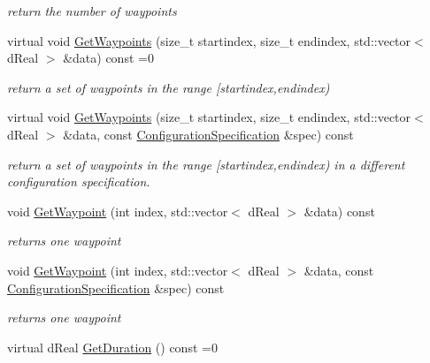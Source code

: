 \begin{DoxyCompactItemize}
\begin{DoxyCompactList}\small\item\em return the number of waypoints \item\end{DoxyCompactList}\item 
virtual void \hyperlink{classOpenRAVE_1_1TrajectoryBase_a27ce506aadd014e6c7e960daf5840e92}{GetWaypoints} (size\_\-t startindex, size\_\-t endindex, std::vector$<$ dReal $>$ \&data) const =0
\begin{DoxyCompactList}\small\item\em return a set of waypoints in the range \mbox{[}startindex,endindex) \item\end{DoxyCompactList}\item 
virtual void \hyperlink{classOpenRAVE_1_1TrajectoryBase_a6a20ad14d835b86e00ecfb25fd1b2b3b}{GetWaypoints} (size\_\-t startindex, size\_\-t endindex, std::vector$<$ dReal $>$ \&data, const \hyperlink{classOpenRAVE_1_1ConfigurationSpecification}{ConfigurationSpecification} \&spec) const 
\begin{DoxyCompactList}\small\item\em return a set of waypoints in the range \mbox{[}startindex,endindex) in a different configuration specification. \item\end{DoxyCompactList}\item 
void \hyperlink{classOpenRAVE_1_1TrajectoryBase_aaf8eb26adc6ee1d49723d97bc5b06fc6}{GetWaypoint} (int index, std::vector$<$ dReal $>$ \&data) const 
\begin{DoxyCompactList}\small\item\em returns one waypoint \item\end{DoxyCompactList}\item 
void \hyperlink{classOpenRAVE_1_1TrajectoryBase_accf42064cea2190dc8756f945d40b59b}{GetWaypoint} (int index, std::vector$<$ dReal $>$ \&data, const \hyperlink{classOpenRAVE_1_1ConfigurationSpecification}{ConfigurationSpecification} \&spec) const 
\begin{DoxyCompactList}\small\item\em returns one waypoint \item\end{DoxyCompactList}\item 
\hypertarget{classOpenRAVE_1_1TrajectoryBase_adde787bbcf5b10de65353d70095ac74f}{
virtual dReal \hyperlink{classOpenRAVE_1_1TrajectoryBase_adde787bbcf5b10de65353d70095ac74f}{GetDuration} () const =0}
\label{classOpenRAVE_1_1TrajectoryBase_adde787bbcf5b10de65353d70095ac74f}


\end{DoxyCompactItemize}
